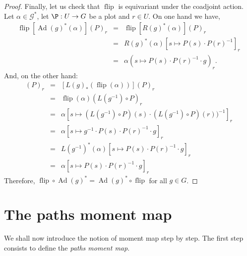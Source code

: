 \documentclass[10pt,reqno,twoside]{amsart}
\newcommand{\cG}{\mathcal{G}}
\DeclareMathOperator{\Ad}{Ad}
\DeclareMathOperator{\flip}{flip}
\newcommand{\R}{R}
\renewcommand{\L}{L}
\theoremstyle{plain}
\theoremstyle{definition}
\begin{document}
\begin{proof}
    Finally,
    let us check that $\flip$ is equivariant under the coadjoint action.
    Let $\alpha \in \cG^*$,
    let $\P: U \to G$ be a plot and $r \in U$.
    On one hand we have,
    \begin{eqnarray*}
      \flip[\Ad(g)^*(\alpha)](P)_r &=& \flip[\R(g)^*(\alpha)](P)_r \\
      & = & \R(g)^*(\alpha)[s \mapsto P (s) \cdot P (r)^{-1}]_r\\
      & = & \alpha(s \mapsto P (s) \cdot P (r)^{-1} \cdot g)_r.
    \end{eqnarray*}
    And,
    on the other hand:
    \begin{eqnarray*}
      [\Ad(g)^*(\flip(\alpha))](P)_r & = & [\L(g)_*(\flip(\alpha))](P)_r \\
      & = & \flip(\alpha)(\L(g^{-1}) \circ P)_r \\
      & = & \alpha[s \mapsto (\L(g^{-1}) \circ P)(s) \cdot (\L(g^{-1}) \circ P)(r))^{-1}]_r \\
      & = & \alpha[s \mapsto g^{-1} \cdot P (s) \cdot P (r)^{-1} \cdot g]_r \\
      & = & \L(g^{-1})^*(\alpha)[s \mapsto P (s) \cdot P (r)^{-1} \cdot g]_r \\
      & = & \alpha[s \mapsto P (s) \cdot P (r)^{-1} \cdot g]_r
    \end{eqnarray*}
    Therefore,
    $\flip \circ \Ad(g)^* = \Ad(g)^* \circ \flip$ for all $g \in G$.
  \end{proof}
  
  \section{The paths moment map}
  
  We shall now introduce the notion of moment map step by step.
  The first step consists to define the {\em paths moment map}.
  
\end{document}
